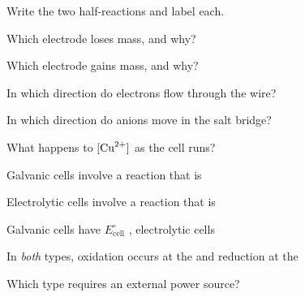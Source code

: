 \documentclass{apchem-worksheet}
\begin{document}
\begin{parts}
  \item Write the two half-reactions and label each.
  \item Which electrode loses mass, and why?
  \item Which electrode gains mass, and why?
  \item In which direction do electrons flow through the wire?
  \item In which direction do anions move in the salt bridge?
  \item What happens to $[\ce{Cu^2+}]$ as the cell runs?
\end{parts}

\begin{parts}
  \item Galvanic cells involve a reaction that is
  \item Electrolytic cells involve a reaction that is
  \item Galvanic cells have $E^\circ_{\text{cell}}$
        , electrolytic cells
  \item In \emph{both} types, oxidation occurs at the
         and reduction at the
  \item Which type requires an external power source?
\end{parts}
\end{document}
